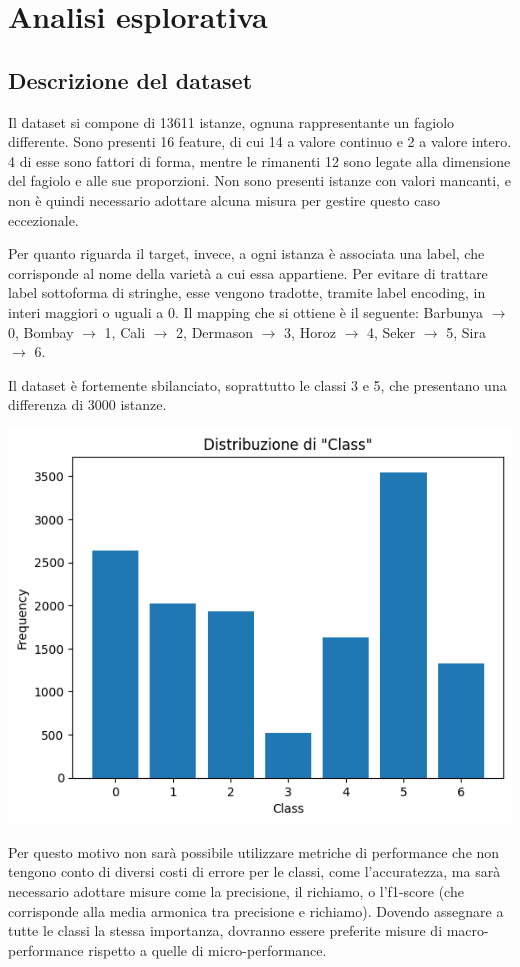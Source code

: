 \section{Analisi esplorativa}
\subsection{Descrizione del dataset}
Il dataset si compone di 13611 istanze, ognuna rappresentante un fagiolo
differente.
Sono presenti 16 feature, di cui 14 a valore continuo e 2 a valore intero.
4 di esse sono fattori di forma, mentre
le rimanenti 12 sono legate alla dimensione del fagiolo e alle
sue proporzioni.
Non sono presenti istanze con valori mancanti, e non è quindi necessario
adottare alcuna misura per gestire questo caso eccezionale.

Per quanto riguarda il target, invece, a ogni istanza è associata una label,
che corrisponde al nome della varietà a cui
essa appartiene. Per evitare di trattare label sottoforma di stringhe,
esse vengono tradotte, tramite label encoding, in interi maggiori o uguali a 0.
Il mapping che si ottiene è il seguente: Barbunya $\rightarrow$ 0, 
Bombay $\rightarrow$ 1, Cali $\rightarrow$ 2, Dermason $\rightarrow$ 3,
Horoz $\rightarrow$ 4, Seker $\rightarrow$ 5, Sira $\rightarrow$ 6.

Il dataset è fortemente sbilanciato, soprattutto le classi 3 e 5, che
presentano una differenza di 3000 istanze. 
\begin{Figure}
    \centering
    \includegraphics[width=\linewidth]{img/unbalanced_dataset.png}
\end{Figure}
Per questo motivo non sarà possibile
utilizzare metriche di performance che non tengono conto di diversi costi
di errore per le classi, come l'accuratezza, ma sarà necessario adottare misure
come la precisione, il richiamo, o l'f1-score (che corrisponde alla media
armonica tra precisione e richiamo).
Dovendo assegnare a tutte le classi la stessa importanza, dovranno essere
preferite misure di macro-performance rispetto a quelle di micro-performance.

